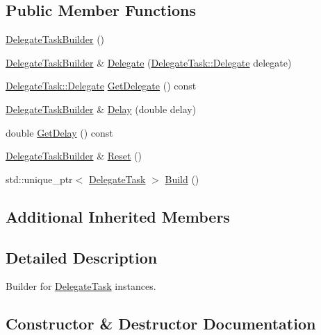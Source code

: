 \subsection*{Public Member Functions}
\begin{DoxyCompactItemize}
\item 
\hyperlink{classastu_1_1DelegateTaskBuilder_ab157afb8138680c515613b4296a7d665}{Delegate\+Task\+Builder} ()
\item 
\hyperlink{classastu_1_1DelegateTaskBuilder}{Delegate\+Task\+Builder} \& \hyperlink{classastu_1_1DelegateTaskBuilder_a40b80e0c6b20c1d6ea04a1c001f34dd2}{Delegate} (\hyperlink{classastu_1_1DelegateTask_a74c7859178eb0889e884209d1604de4d}{Delegate\+Task\+::\+Delegate} delegate)
\item 
\hyperlink{classastu_1_1DelegateTask_a74c7859178eb0889e884209d1604de4d}{Delegate\+Task\+::\+Delegate} \hyperlink{classastu_1_1DelegateTaskBuilder_abcbf0e7dbc8e4eed11a1214a266627ea}{Get\+Delegate} () const
\item 
\hyperlink{classastu_1_1DelegateTaskBuilder}{Delegate\+Task\+Builder} \& \hyperlink{classastu_1_1DelegateTaskBuilder_afff9f95d05d896a74935287e087eb2c4}{Delay} (double delay)
\item 
double \hyperlink{classastu_1_1DelegateTaskBuilder_a34340f7e709dea5c18aa4f4718e1bc79}{Get\+Delay} () const
\item 
\hyperlink{classastu_1_1DelegateTaskBuilder}{Delegate\+Task\+Builder} \& \hyperlink{classastu_1_1DelegateTaskBuilder_ad871e5e55e2d17fae9ae8503c179fc8f}{Reset} ()
\item 
std\+::unique\+\_\+ptr$<$ \hyperlink{classastu_1_1DelegateTask}{Delegate\+Task} $>$ \hyperlink{classastu_1_1DelegateTaskBuilder_a381daaf1473172b912ffe84da830c75c}{Build} ()
\end{DoxyCompactItemize}
\subsection*{Additional Inherited Members}


\subsection{Detailed Description}
Builder for \hyperlink{classastu_1_1DelegateTask}{Delegate\+Task} instances. 

\subsection{Constructor \& Destructor Documentation}
\mbox{\label{classastu_1_1DelegateTaskBuilder_ab157afb8138680c515613b4296a7d665}} 

